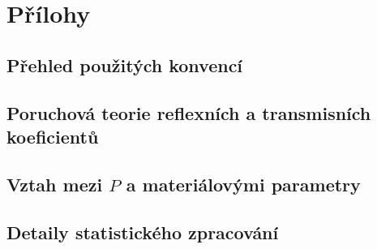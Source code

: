 \chapter{Přílohy}
  \section{Přehled použitých konvencí}\label{k:dodatek konvence}
  \section{Poruchová teorie reflexních a transmisních koeficientů}\label{k:dodatek vypocet}
  \section{Vztah mezi $P$ a materiálovými parametry}
  \section{Detaily statistického zpracování}